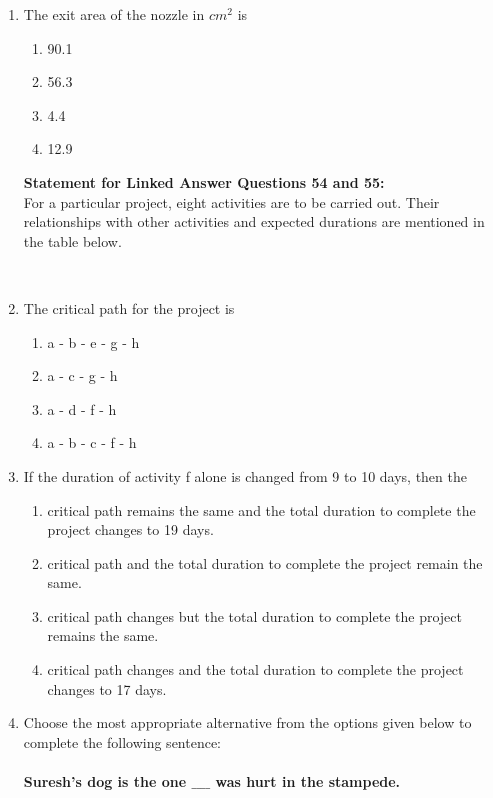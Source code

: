 \documentclass[journal]{IEEEtran}
\begin{document}
\begin{enumerate}
\item The exit area of the nozzle in $cm^2$ is 
    \begin{enumerate}
      \item 90.1
      \item 56.3
      \item 4.4
      \item 12.9 \\
    \end{enumerate}
\textbf{Statement for Linked Answer Questions 54 and 55:}\\
For a particular project, eight activities are to be carried out. Their relationships with other activities and expected durations are mentioned in the table below. 
\begin{table}[h!]
  \centering
  
\end{table}\\
\item The critical path for the project is 
\begin{enumerate}
    \item a - b - e - g - h
    \item a - c - g - h
    \item a - d - f - h
    \item a - b - c - f - h \\
\end{enumerate}
\item If the duration of activity f alone is changed from 9 to 10 days, then the
\begin{enumerate}
    \item critical path remains the same and the total duration to complete the project changes to 19 days.
    \item critical path and the total duration to complete the project remain the same.
    \item critical path changes but the total duration to complete the project remains the same.
    \item critical path changes and the total duration to complete the project changes to 17 days. \\
\end{enumerate}
\item Choose the most appropriate alternative from the options given below to complete the following sentence:\\\\
\textbf{Suresh's dog is the one $\_\_\_\_$ was hurt in the stampede.}

\end{enumerate}
\end{document}

